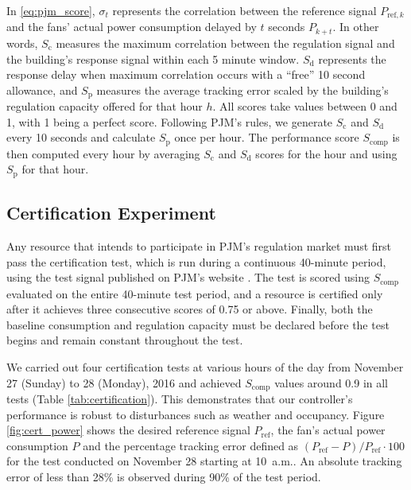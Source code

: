 In \eqref{eq:pjm_score}, $\sigma_t$ represents the correlation between the reference signal $P_{\text{ref},k}$ and the fans' actual power consumption delayed by $t$ seconds $P_{k+t}$. In other words, $S_\text{c}$ measures the maximum correlation between the regulation signal and the building's response signal within each 5 minute window. $S_\text{d}$ represents the response delay when maximum correlation occurs with a ``free'' 10 second allowance, and $S_\text{p}$ measures the average tracking error scaled by the building's regulation capacity offered for that hour $h$.
All scores take values between 0 and 1, with 1 being a perfect score. 
Following PJM's rules, we generate $S_\text{c}$ and $S_\text{d}$ every 10 seconds and calculate $S_\text{p}$ once per hour.
The performance score $S_\text{comp}$ is then computed every hour by averaging $S_\text{c}$ and $S_\text{d}$ scores for the hour and using $S_\text{p}$ for that hour.




\subsection{Certification Experiment}\label{sec:certification_exp}
Any resource that intends to participate in PJM's regulation market must first pass the certification test, which is run during a continuous 40-minute period, using the test signal published on PJM's website \cite{PJM_signal_price}.
The test is scored using $S_\text{comp}$ evaluated on the entire 40-minute test period, and a resource is certified only after it achieves three consecutive scores of 0.75 or above.
Finally, both the baseline consumption and regulation capacity must be declared before the test begins and remain constant throughout the test.



We carried out four certification tests at various hours of the day from November 27 (Sunday) to 28 (Monday), 2016 and achieved $S_\text{comp}$ values around 0.9 in all tests (Table \ref{tab:certification}). This demonstrates that our controller's performance is robust to disturbances such as weather and occupancy. 
Figure \ref{fig:cert_power} shows the desired reference signal $P_{\text{ref}}$, the fan's actual power consumption $P$ and the percentage tracking error defined as $(P_\text{ref} - P)/P_\text{ref} \cdot 100 $ for the test conducted on November 28 starting at 10~a.m.. An absolute tracking error of less than 28\% is observed during 90\% of the test period.

